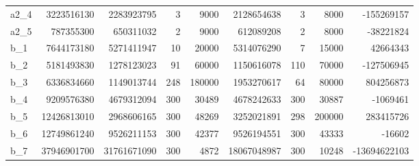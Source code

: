 \documentclass[../informe2.tex]{subfiles}
\begin{document}
\begin{table}[h]
{\begin{tabular}{@{}lrrrrrrrr@{}}
a2\_4     & 3223516130                  & 2283923795             & 3                          & 9000                            & 2128654638                & 3                          & 8000                            & -155269157                     \\
a2\_5     & 787355300                   & 650311032              & 2                          & 9000                            & 612089208                 & 2                          & 8000                            & -38221824                      \\
b\_1      & 7644173180                  & 5271411947             & 10                         & 20000                           & 5314076290                & 7                          & 15000                           & 42664343                       \\
b\_2      & 5181493830                  & 1278123023             & 91                         & 60000                           & 1150616078                & 110                        & 70000                           & -127506945                     \\
b\_3      & 6336834660                  & 1149013744             & 248                        & 180000                          & 1953270617                & 64                         & 80000                           & 804256873                      \\
b\_4      & 9209576380                  & 4679312094             & 300                        & 30489                           & 4678242633                & 300                        & 30887                           & -1069461                       \\
b\_5      & 12426813010                 & 2968606165             & 300                        & 48269                           & 3252021891                & 298                        & 200000                          & 283415726                      \\
b\_6      & 12749861240                 & 9526211153             & 300                        & 42377                           & 9526194551                & 300                        & 43333                           & -16602                         \\
b\_7      & 37946901700                 & 31761671090            & 300                        & 4872                            & 18067048987               & 300                        & 10248                           & -13694622103                   \\

\end{tabular}}
\end{table}
\end{document}

